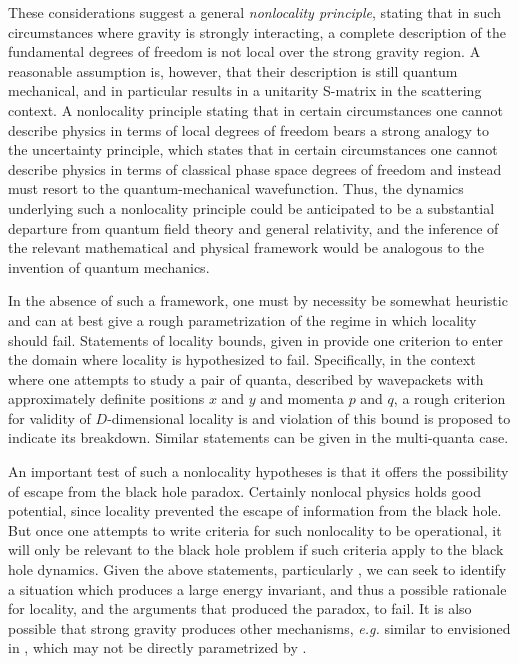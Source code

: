 These considerations suggest a general {\it nonlocality principle}, stating that in such circumstances where gravity is strongly interacting, a complete description of the fundamental degrees of freedom is not local over the strong gravity region.  A reasonable assumption is, however, that their description is still quantum mechanical, and in particular results in a unitarity S-matrix in the scattering context.  A nonlocality principle stating that in certain circumstances one cannot describe physics in terms of local degrees of freedom bears a strong analogy to the uncertainty principle, which states that in certain circumstances one cannot describe physics in terms of classical phase space degrees of freedom and instead must resort to the quantum-mechanical wavefunction.  Thus, the dynamics underlying such a nonlocality principle could be anticipated to be a substantial departure from quantum field theory and general relativity, and the inference of the relevant mathematical and physical framework would be analogous to the invention of quantum mechanics.

In the absence of such a framework, one must by necessity be somewhat heuristic and
can at best give a rough parametrization of the regime in which locality should fail.  Statements of locality bounds, given in  provide one criterion to enter the domain where locality is hypothesized to fail.  Specifically, in the context where one attempts to study a pair of quanta, described by wavepackets with approximately definite positions $x$ and $y$ and momenta $p$ and $q$, a rough criterion for validity of $D$-dimensional locality is
%
\eqn{}
%
and violation of this bound is proposed to indicate its breakdown.
Similar statements can be given in the multi-quanta case\SGloc.

An important test of such a nonlocality hypotheses is that it offers the possibility of escape from the black hole paradox.  Certainly nonlocal physics holds good potential, since locality prevented the escape of information from the black hole.  But once one attempts to write criteria for such nonlocality to be operational, it will only be relevant to the black hole problem if such criteria apply to the black hole dynamics.  Given the above statements, particularly \locbd, we can seek to identify a situation which produces a large energy invariant, and thus a possible rationale for locality, and the arguments that produced the paradox, to fail.  It is also possible that strong gravity produces other mechanisms, {\it e.g.} similar to envisioned in \BHMR, which may not be directly parametrized by \locbd.


